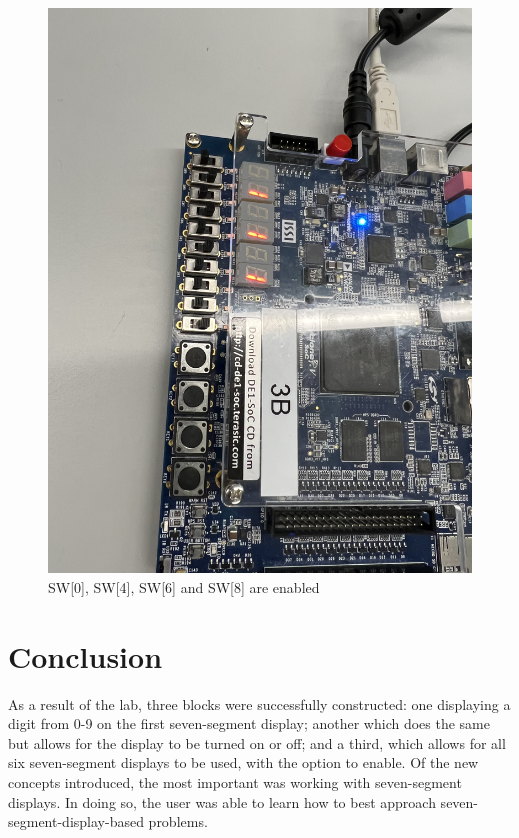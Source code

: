 \documentclass[
	letterpaper, %
	10pt, %
]{CSUniSchoolLabReport}
\begin{document}
\begin{figure}[H]
  \centering
  \includegraphics[width=.9\textwidth]{Figures/Three1.jpg}
  \caption{SW[0], SW[4], SW[6] and SW[8] are enabled}
  \label{fig:19}
\end{figure}

\section{Conclusion}

\hspace{.5 in} As a result of the lab, three blocks were successfully constructed: one displaying a digit from 0-9 on the first seven-segment display; another which does the same but allows for the display to be turned on or off; and a third, which allows for all six seven-segment displays to be used, with the option to enable. Of the new concepts introduced, the most important was working with seven-segment displays. In doing so, the user was able to learn how to best approach seven-segment-display-based problems. 
\end{document}
